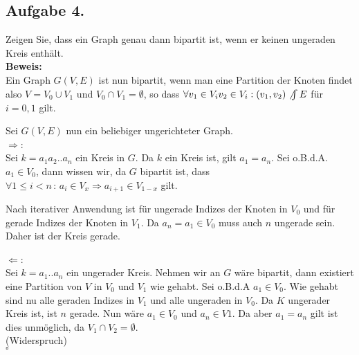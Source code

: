 \documentclass[11pt,a4paper,ngerman]{article}
\begin{document}
\subsection*{Aufgabe 4.}

Zeigen Sie, dass ein Graph genau dann bipartit ist, wenn er keinen ungeraden Kreis enthält.\\

\textbf{Beweis:}\\

Ein Graph $G(V,E)$ ist nun bipartit, wenn man eine Partition der Knoten findet also $V = V_0 \cup V_1$ und $V_0 \cap V_1 = \emptyset$,
so dass $\forall v_1 \in V_i v_2 \in V_i : (v_1,v_2) \not \int E$ für $i=0,1$ gilt.

Sei $G(V,E)$ nun ein beliebiger ungerichteter Graph.\\

$\Rightarrow$:\\

Sei $k = a_1a_2..a_n$ ein Kreis in $G$. Da $k$ ein Kreis ist, gilt $a_1=a_n$.
Sei o.B.d.A. $a_1 \in V_0$, dann wissen wir, da $G$ bipartit ist, dass $\forall 1 \leq i < n \, : \, a_i \in V_x \Rightarrow a_{i+1} \in V_{1-x}$ gilt.

Nach iterativer Anwendung ist für ungerade Indizes der Knoten in $V_0$ und für gerade Indizes der Knoten in $V_1$. Da $a_n = a_1 \in V_0$ muss auch $n$ ungerade sein.
Daher ist der Kreis gerade.

$\Leftarrow$:\\

Sei $k = a_1..a_n$ ein ungerader Kreis.
Nehmen wir an $G$ wäre bipartit, dann existiert eine Partition von $V$ in $V_0$ und $V_1$ wie gehabt.
Sei o.B.d.A $a_1 \in V_0$. Wie gehabt sind nu alle geraden Indizes in $V_1$ und alle ungeraden in $V_0$.
Da $K$ ungerader Kreis ist, ist $n$ gerade. Nun wäre $a_1 \in V_0$ und $a_n \in V1$. Da aber 
$a_1 = a_n$ gilt ist dies unmöglich, da $V_1 \cap V_2 = \emptyset$.\\
(Widerspruch)\\

\mbox{}\hfill$\square$

\label{LastPage}
\end{document}
